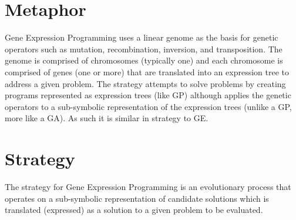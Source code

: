 \documentclass[a4paper, 11pt]{article}
\begin{document}
\section{Metaphor}
\label{sec:metaphor}
Gene Expression Programming uses a linear genome as the basis for genetic operators such as mutation, recombination, inversion, and transposition. The genome is comprised of chromosomes (typically one) and each chromosome is comprised of genes (one or more) that are translated into an expression tree to address a given problem. The strategy attempts to solve problems by creating programs represented as expression trees (like GP) although applies the genetic operators to a sub-symbolic representation of the expression trees (unlike a GP, more like a GA). As such it is similar in strategy to GE.

\section{Strategy}
\label{sec:strategy}
The strategy for Gene Expression Programming is an evolutionary process that operates on a sub-symbolic representation of candidate solutions which is translated (expressed) as a solution to a given problem to be evaluated.

\end{document}
